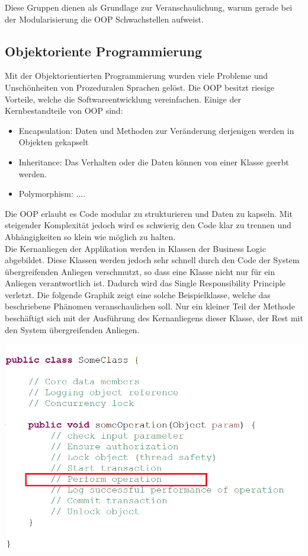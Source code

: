 Diese Gruppen dienen als Grundlage zur Veranschaulichung, warum gerade bei der Modularisierung die OOP Schwachstellen aufweist.

\subsection{Objektoriente Programmierung}
\label{sec:aop_oop}

Mit der Objektorientierten Programmierung wurden viele Probleme und Unschönheiten von Prozeduralen Sprachen gelöst. Die OOP besitzt riesige Vorteile, welche die Softwareentwicklung vereinfachen. Einige der Kernbestandteile von OOP sind:

\begin{itemize}
	\item Encapsulation: Daten und Methoden zur Veränderung derjenigen werden in Objekten gekapselt
	\item Inheritance: Das Verhalten oder die Daten können von einer Klasse geerbt werden.
	\item Polymorphism: ....
\end{itemize}

Die OOP erlaubt es Code modular zu strukturieren und Daten zu kapseln. Mit steigender Komplexität jedoch wird es schwierig den Code klar zu trennen und Abhängigkeiten so klein wie möglich zu halten.\\

Die Kernanliegen der Applikation werden in Klassen der Business Logic abgebildet. Diese Klassen werden jedoch sehr schnell durch den Code der System übergreifenden Anliegen verschmutzt, so dass eine Klasse nicht nur für ein Anliegen verantwortlich ist. Dadurch wird das Single Responsibility Principle verletzt. Die folgende Graphik zeigt eine solche Beispielklasse, welche das beschriebene Phänomen veranschaulichen soll. Nur ein kleiner Teil der Methode beschäftigt sich mit der Ausführung des Kernanliegens dieser Klasse, der Rest mit den System übergreifenden Anliegen.

\includegraphics[scale=1.0]{bilder/motivationprogram.png}

